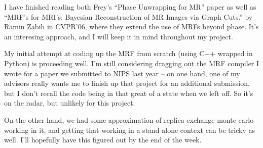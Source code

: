 
I have finished reading both Frey's ``Phase Unwrapping for MR'' paper
as well as ``MRF's for MRI's: Bayesian Reconstruction of MR Images via
Graph Cuts.''  by Ramin Zabih in CVPR'06, where they extend the use of 
MRFs beyond phase. It's an interesing approach, and I will keep it in 
mind throughout my project. 

My initial attempt at coding up the MRF from scratch (using C++
wrapped in Python) is proceeding well. I'm still considering dragging
out the MRF compiler I wrote for a paper we submitted to NIPS last
year -- on one hand, one of my advisors really wants me to finish up
that project for an additional submission, but I don't recall the code
being in that great of a state when we left off. So it's on the radar, 
but unlikely for this project. 

On the other hand, we had some approximation of replica exchange monte
carlo working in it, and getting that working in a stand-alone context
can be tricky as well. I'll hopefully have this figured out by the end
of the week.



